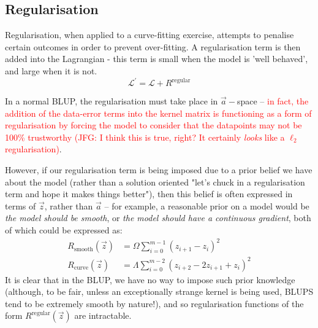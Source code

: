 \documentclass[]{article}
\begin{document}
		\subsection{Regularisation}

			Regularisation, when applied to a curve-fitting exercise, attempts to penalise certain outcomes in order to prevent over-fitting. A regularisation term is then added into the Lagrangian - this term is small when the model is 'well behaved', and large when it is not.
			\begin{equation}
				\mathcal{L}^\prime = \mathcal{L} + R^\text{regular}
			\end{equation}

			In a normal BLUP, the regularisation must take place in $\vec{a}-$space -- \textcolor{red}{in fact, the addition of the data-error terms into the kernel matrix is functioning as a form of regularisation by forcing the model to consider that the datapoints may not be 100\% trustworthy (JFG: I think this is true, right? It certainly \textit{looks} like a $\ell_2$ regularisation)}.

			However, if our regularisation term is being imposed due to a prior belief we have about the model (rather than a solution oriented "let's chuck in a regularisation term and hope it makes things better"), then this belief is often expressed in terms of $\vec{z}$, rather than $\vec{a}$ -- for example, a reasonable prior on a model would be \textit{the model should be smooth}, or \textit{the model should have a continuous gradient}, both of which could be expressed as:
			\begin{align}
				R_\text{smooth}(\vec{z}) &=  \Omega \sum_{i=0}^{m-1} (z_{i+1} - z_i)^2
				\\
				R_\text{curve}(\vec{z}) &=  \Lambda \sum_{i = 0}^{m-2} (z_{i+2} - 2 z_{i+1} + z_i)^2
			\end{align}
			It is clear that in the BLUP, we have no way to impose such prior knowledge (although, to be fair, unless an exceptionally strange kernel is being used, BLUPS tend to be extremely smooth by nature!), and so regularisation functions of the form $R^\text{regular}(\vec{z})$ are intractable. 
\end{document}
